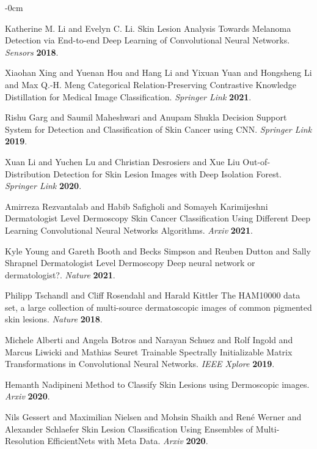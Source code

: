 \documentclass[sensors,article,submit,pdftex,moreauthors]{Definitions/mdpi}
\begin{document}
\begin{adjustwidth}{-\extralength}{0cm}
\begin{thebibliography}{999}
Katherine M. Li and Evelyn C. Li. Skin Lesion Analysis Towards Melanoma Detection via End-to-end Deep Learning of Convolutional Neural Networks. 
{\em Sensors} 
{\bf 2018}.

Xiaohan Xing and Yuenan Hou and  Hang Li and Yixuan Yuan and Hongsheng Li and Max Q.-H. Meng Categorical Relation-Preserving Contrastive Knowledge Distillation for Medical Image Classification. 
{\em Springer Link} 
{\bf 2021}.

Rishu Garg and Saumil Maheshwari and Anupam Shukla Decision Support System for Detection and Classification of Skin Cancer using CNN. {\em Springer Link} {\bf 2019}.

Xuan Li and Yuchen Lu and Christian Desrosiers and Xue Liu Out-of-Distribution Detection for Skin Lesion Images with Deep Isolation Forest. 
{\em Springer Link} 
{\bf 2020}.

Amirreza Rezvantalab and Habib Safigholi and Somayeh Karimijeshni Dermatologist Level Dermoscopy Skin Cancer Classification Using Different Deep Learning Convolutional Neural Networks Algorithms. 
{\em Arxiv} 
{\bf 2021}.

Kyle Young and Gareth Booth and Becks Simpson and Reuben Dutton and Sally Shrapnel Dermatologist Level Dermoscopy Deep neural network or dermatologist?. {\em Nature} 
{\bf 2021}.

Philipp Tschandl and Cliff Rosendahl and Harald Kittler The HAM10000 data set, a large collection of multi-source dermatoscopic images of common pigmented skin lesions. 
{\em Nature} 
{\bf 2018}.

Michele Alberti and Angela Botros and Narayan Schuez and Rolf Ingold and Marcus Liwicki and Mathias Seuret Trainable Spectrally Initializable Matrix Transformations in Convolutional Neural Networks. 
{\em IEEE Xplore} 
{\bf 2019}.

Hemanth Nadipineni Method to Classify Skin Lesions using Dermoscopic images. {\em Arxiv} 
{\bf 2020}.

Nils Gessert and Maximilian Nielsen and Mohsin Shaikh and René Werner and Alexander Schlaefer Skin Lesion Classification Using Ensembles of Multi-Resolution EfficientNets with Meta Data. 
{\em Arxiv} 
{\bf 2020}.


\end{thebibliography}
\end{adjustwidth}
\end{document}
